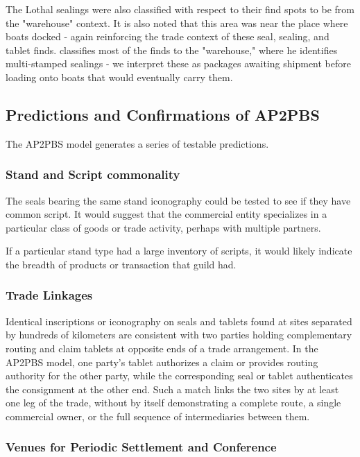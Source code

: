\documentclass[12pt]{article}
\begin{document}
The Lothal sealings were also classified with respect to their find spots
to be from the "warehouse" context. It is also noted that this area was near the
place where boats docked - again reinforcing the trade context of these seal,
sealing, and tablet finds. \citet{frenez2024} classifies most of the finds
to the "warehouse," where he identifies multi-stamped sealings - we interpret these
as packages awaiting shipment before loading onto boats that would eventually
carry them.


\subsection{Predictions and Confirmations of AP2PBS}

The AP2PBS model generates a series of testable predictions.

\subsubsection{Stand and Script commonality}

The seals bearing the same stand iconography could be tested to see if they have
common script.  It would suggest that the commercial entity specializes in a
particular class of goods or trade activity, perhaps with multiple partners.

If a particular stand type had a large inventory of scripts, it would likely indicate
the breadth of products or transaction that guild had.

\subsubsection{Trade Linkages}

Identical inscriptions or iconography on seals and tablets found at sites separated
by hundreds of kilometers are consistent with two parties holding complementary
routing and claim tablets at opposite ends of a trade arrangement. In the AP2PBS
model, one party's tablet authorizes a claim or provides routing authority for the
other party, while the corresponding seal or tablet authenticates the consignment
at the other end. Such a match links the two sites by at least one leg of the trade,
without by itself demonstrating a complete route, a single commercial owner, or
the full sequence of intermediaries between them.

\subsubsection{Venues for Periodic Settlement and Conference}
\end{document}
